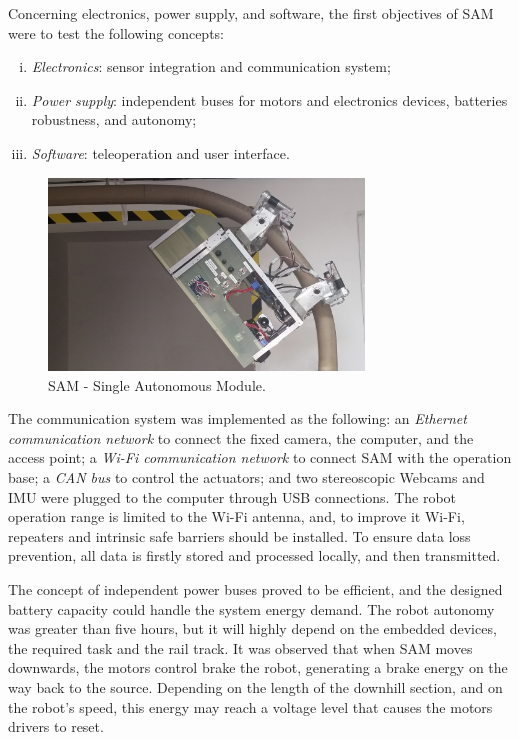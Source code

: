 \documentclass{ifacconf}
\begin{document}
Concerning electronics, power supply, and software, the first objectives of SAM were to test the following concepts:
\begin{enumerate}[i)]
  \item \emph{Electronics}: sensor integration and communication system;
  \item \emph{Power supply}: independent buses for motors and electronics
  devices, batteries robustness, and autonomy;
  \item \emph{Software}: teleoperation and user interface.
  \end{enumerate}

\begin{figure}[!h]
\centering
\includegraphics[width=8.4cm]{figs/SAM5.jpg}
\caption{SAM - Single Autonomous Module.}
\label{fig:SAM2}
\end{figure}

The communication system was implemented as the following: an \emph{Ethernet
communication network} to connect the fixed camera, the computer, and the access
point; a \emph{Wi-Fi communication network} to connect SAM with the operation
base; a \emph{CAN bus} to control the actuators; and two stereoscopic
Webcams and IMU were plugged to the computer through USB connections. The robot operation range is
limited to the Wi-Fi antenna, and, to improve it Wi-Fi,
repeaters and intrinsic safe barriers should be installed.
To ensure data loss prevention, all data is firstly stored and processed
locally, and then transmitted.

The concept of independent power buses proved to be efficient, and the designed
battery capacity could handle the system energy demand. The robot autonomy was
greater than five hours, but it will highly depend on the embedded devices, the
required task and the rail track. It was observed that when SAM moves
downwards, the motors control brake the robot, generating a brake energy on the
way back to the source. Depending on the length of the downhill section, and on
the robot's speed, this energy may reach a voltage level that causes the motors
drivers to reset.
\end{document}
